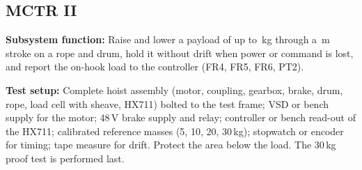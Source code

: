 \subsection{MCTR II}
\label{subsec:mctr-ii-tests}



\textbf{Subsystem function:} Raise and lower a payload of up to \InMassRated\,kg through
a \InStroke\,m stroke on a rope and drum, hold it without drift when power or command is
lost, and report the on-hook load to the controller (FR4, FR5, FR6, PT2).
 
\textbf{Test setup:} Complete hoist assembly (motor, coupling, gearbox, brake, drum, rope,
load cell with sheave, HX711) bolted to the test frame; VSD or bench supply for the motor;
48\,V brake supply and relay; controller or bench read-out of the HX711; calibrated
reference masses (5, 10, 20, 30\,kg); stopwatch or encoder for timing; tape measure for drift.
Protect the area below the load. The 30\,kg proof test is performed last.
 
